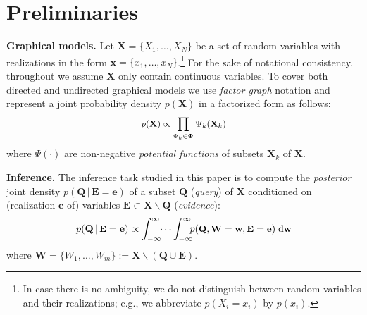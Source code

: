 \documentclass[letterpaper]{article}
\renewcommand{\vec}[1]{\mathbf{#1}}
\newcommand{\bvec}[1]{\textbf{#1}}
\newcommand{\pr}{p}
\newcommand{\dd}{\;\mathrm{d}} %
\begin{document}
\section{Preliminaries}
\label{sect:background}
{\bf Graphical models.} Let $\vec{X} = \{X_1, \ldots, X_N\}$ be a set of random variables with realizations in the form 
$\vec{x} = \{x_1, \ldots, x_N\}$.\footnote{
In case there is no ambiguity, we do not distinguish between random variables and their realizations; e.g., we abbreviate $\pr(X_i = x_i)$ by $\pr(x_i)$.}
For the sake of notational consistency, 
throughout we assume $\vec{X}$ only contain continuous variables. 
To cover both directed and undirected graphical models we use
\emph{factor graph} notation \cite{kschischang2001factor}
and represent a joint probability density $\pr(\vec{X})$ in a factorized form as follows: 
\begin{equation} \footnotesize
\label{e:factor-graph}
\pr(\vec{X}) \propto \prod_{\Psi_k \in \boldsymbol\Psi} \Psi_k (\vec{X}_k)
\end{equation}
where 
$\Psi(\cdot)$ are non-negative \emph{potential functions} 
of subsets $\bvec{X}_k$ of $\bvec{X}$. 

\noindent
{\bf Inference.} The inference task studied in this paper is to compute the \emph{posterior} joint density 
$\pr(\bvec{Q} \,|\, \bvec{E}=\bvec{e})$
of 
a subset $\bvec{Q}$ (\emph{query}) of $\bvec{X}$ 
conditioned on (realization $\bvec{e}$ of) 
variables  
$\bvec{E} \subset\bvec{X} \backslash \bvec{Q}$ (\emph{evidence}):
\begin{equation}\vspace{-0.5mm}\footnotesize
\label{e:inference}
\pr(\vec{Q} \,|\, \bvec{E} =\vec{e}) \propto 
\int_{-\infty}^{\infty} \!\! \cdots \int_{-\infty}^{\infty}
\!\!\! \pr(\bvec{Q}, \bvec{W} = \bvec{w}, \bvec{E}=\bvec{e} )
 \dd \bvec{w}
\end{equation}
where $\bvec{W} = \{W_1, \ldots, W_m\} := \vec{X} \backslash (\vec{Q} \cup \vec{E})$. %
\end{document}
